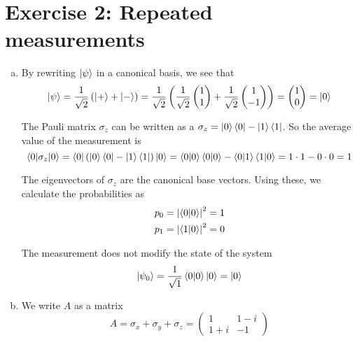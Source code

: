 \documentclass[a4paper,german,12pt,smallheadings]{scrartcl}
\begin{document}
\section*{Exercise 2: Repeated measurements}
\begin{enumerate}[a)]
  \item
    By rewriting $\ket{\psi}$ in a canonical basis, we see that
    \begin{equation*}
      \ket{\psi} 
      = \frac{1}{\sqrt{2}} \left( \ket{+} + \ket{-} \right)
      = \frac{1}{\sqrt{2}} \left( \frac{1}{\sqrt{2}} \begin{pmatrix} 1 \\ 1\end{pmatrix} + \frac{1}{\sqrt{2}} \begin{pmatrix} 1 \\ -1 \end{pmatrix} \right) = \begin{pmatrix} 1 \\ 0 \end{pmatrix} = \ket{0}
    \end{equation*}

    The Pauli matrix $\sigma_z$ can be written as a $\sigma_z = \ket{0}\bra{0}
    - \ket{1}\bra{1}$. So the average value of the measurement is
    \begin{equation*}
      \braket{0|\sigma_z|0} 
      = \bra{0}(\ket{0}\bra{0} - \ket{1}\bra{1})\ket{0}
      = \braket{0|0}\braket{0|0} - \braket{0|1}\braket{1|0}
      = 1\cdot1 - 0 \cdot 0
      = 1
    \end{equation*}

    The eigenvectors of $\sigma_z$ are the canonical base vectors. Using these,
    we calculate the probabilities as
    \begin{align*}
      p_0 = \left|\braket{0|0}\right|^2 = 1 \\
      p_1 = \left|\braket{1|0}\right|^2 = 0
    \end{align*}

    The measurement does not modify the state of the system
    \begin{equation*}
      \ket{\psi_0} = \frac{1}{\sqrt{1}} \braket{0|0} \ket{0} = \ket{0}
    \end{equation*}

  \item
    We write $A$ as a matrix
    \begin{equation*}
      A = \sigma_x + \sigma_y + \sigma_z = \begin{pmatrix} 1 & 1-i \\ 1+i & -1\end{pmatrix}
    \end{equation*}


\end{enumerate}
\end{document}
